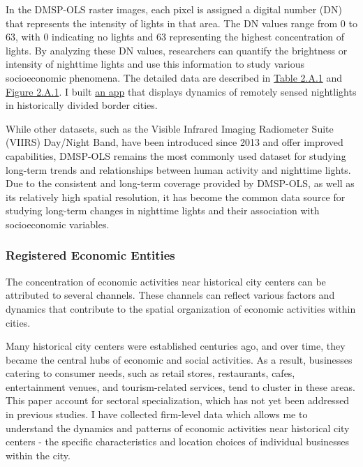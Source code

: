 \documentclass[12pt]{article}    %
\begin{document}
\par In the DMSP-OLS raster images, each pixel is assigned a digital number (DN) that represents the intensity of lights in that area. The DN values range from 0 to 63, with 0 indicating no lights and 63 representing the highest concentration of lights. By analyzing these DN values, researchers can quantify the brightness or intensity of nighttime lights and use this information to study various socioeconomic phenomena.  The detailed data are described in \hyperlink{Table 2.A.1}{Table 2.A.1} and \hyperlink{Figure 2.A.1}{Figure 2.A.1}. I built  \href{https://europe-nightlight.shinyapps.io/cities/}{an app} that displays dynamics of remotely sensed nightlights in historically divided border cities.

\par  While other datasets, such as the Visible Infrared Imaging Radiometer Suite (VIIRS) Day/Night Band, have been introduced since 2013 and offer improved capabilities, DMSP-OLS remains the most commonly used dataset for studying long-term trends and relationships between human activity and nighttime lights. Due to the consistent and long-term coverage provided by DMSP-OLS, as well as its relatively high spatial resolution, it has become the common data source for studying long-term changes in nighttime lights and their association with socioeconomic variables.
\subsubsection{Registered Economic Entities}
The concentration of economic activities near historical city centers can be attributed to several channels. These channels can reflect various factors and dynamics that contribute to the spatial organization of economic activities within cities. 

\par  Many historical city centers were established centuries ago, and over time, they became the central hubs of economic and social activities. As a result, businesses catering to consumer needs, such as retail stores, restaurants, cafes, entertainment venues, and tourism-related services, tend to cluster in these areas. This paper account for sectoral specialization, which has not yet been addressed in previous studies. I have collected firm-level data which allows me to understand the dynamics and patterns of economic activities near historical city centers - the specific characteristics and location choices of individual businesses within the city.
\end{document}
